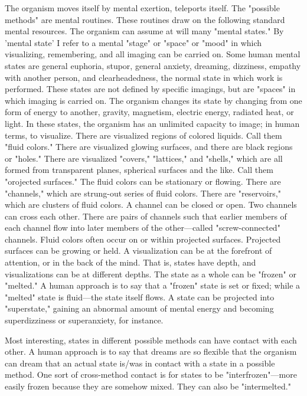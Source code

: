 \documentclass[10pt,twoside]{memoir}
\begin{document}
\begin{enumerate}
{\begin{enumerate}
\begin{sysrules}
\begin{sysrules}
\begin{sysrules}
\begin{sysrules}
{\begin{enumerate}
The organism moves itself by mental exertion, teleports itself. The 
"possible methods" are mental routines. These routines draw on the 
following standard mental resources. The organism can assume at will many 
"mental states." By 'mental state' I refer to a mental "stage" or "space" or 
"mood" in which visualizing, remembering, and all imaging can be carried 
on. Some human mental states are general euphoria, stupor, general anxiety, 
dreaming, dizziness, empathy with another person, and clearheadedness, the 
normal state in which work is performed. These states are not defined by 
specific imagings, but are "spaces" in which imaging is carried on. The 
organism changes its state by changing from one form of energy to another, 
gravity, magnetism, electric energy, radiated heat, or light. In these states, 
the organism has an unlimited capacity to image; in human terms, to 
visualize. There are visualized regions of colored liquids. Call them "fluid 
colors." There are visualized glowing surfaces, and there are black regions or 
"holes." There are visualized "covers," "lattices," and "shells," which are all 
formed from transparent planes, spherical surfaces and the like. Call them 
"orojected surfaces." The fluid colors can be stationary or flowing. There are 
"channels," which are strung-out series of fluid colors. There are 
"reservoirs," which are clusters of fluid colors. A channel can be closed or 
open. Two channels can cross each other. There are pairs of channels such 
that earlier members of each channel flow into later members of the 
other---called "screw-connected" channels. Fluid colors often occur on or 
within projected surfaces. Projected surfaces can be growing or held. A 
visualization can be at the forefront of attention, or in the back of the mind. 
That is, states have depth, and visualizations can be at different depths. The 
state as a whole can be "frozen" or "melted." A human approach is to say 
that a "frozen" state is set or fixed; while a "melted" state is fluid---the state 
itself flows. A state can be projected into "superstate," gaining an abnormal 
amount of mental energy and becoming superdizziness or superanxiety, for 
instance. 

Most interesting, states in different possible methods can have contact 
with each other. A human approach is to say that dreams are so flexible that 
the organism can dream that an actual state is\slash was in contact with a state in 
a possible method. One sort of cross-method contact is for states to be 
"interfrozen"---more easily frozen because they are somehow mixed. They 
can also be "intermelted." 


\end{enumerate}}
\end{sysrules}
\end{sysrules}
\end{sysrules}
\end{sysrules}
\end{enumerate}}
\end{enumerate}
\end{document}
